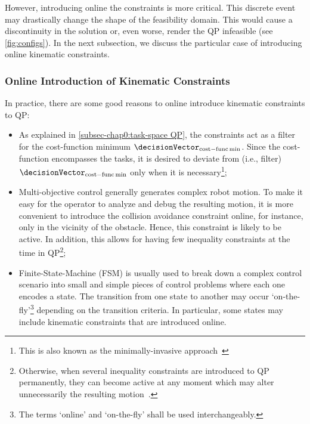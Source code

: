 However, introducing online the constraints is more critical. This discrete event may drastically change the shape of the feasibility domain. This would cause a discontinuity in the solution or, even worse, render the QP infeasible (see \cref{fig:configs}). In the next subsection, we  discuss the particular case of introducing online kinematic constraints. 

\subsubsection{Online Introduction of Kinematic Constraints}\label{subsubsec-chap0:online constraints introduction}
In practice, there are some good reasons to online introduce kinematic constraints to QP:
\begin{itemize}
	\item As explained in \cref{subsec-chap0:task-space QP}, the constraints act as a filter for the cost-function minimum $\decisionVector_{\rm cost-func \min}$. Since the cost-function encompasses the tasks, it is desired to deviate from (i.e., filter) $\decisionVector_{\rm cost-func \min}$ only when it is necessary\footnote{This is also known as the minimally-invasive approach~\cite{tan2021tac,singletary2021iros}};
	\item Multi-objective control generally generates complex robot motion. To make it easy for the operator to analyze and debug the resulting motion, it is more convenient to introduce the collision avoidance constraint online, for instance, only in the vicinity of the obstacle. Hence, this constraint is likely to be active. In addition, this allows for having few inequality constraints at the time in QP\footnote{Otherwise, when several inequality constraints are introduced to QP permanently, they can become active at any moment which may alter  unnecessarily the resulting motion~\cite{cortez2021csl}.};
	\item Finite-State-Machine (FSM) is usually used to break down a complex control scenario into small and simple pieces of control problems where each one encodes a state. The transition from one state to another may occur ‘on-the-fly’\footnote{The terms ‘online’ and ‘on-the-fly’ shall be used interchangeably.} depending on the transition criteria. In particular, some states may include kinematic constraints that are introduced online.
\end{itemize}

